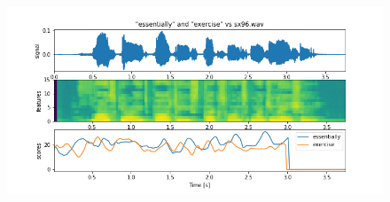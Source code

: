 \documentclass[11pt]{article}
\begin{document}
\begin{figure}[h]
	\includegraphics[width=\linewidth]{./docs/sx96.png}
\end{figure}
\end{document}
